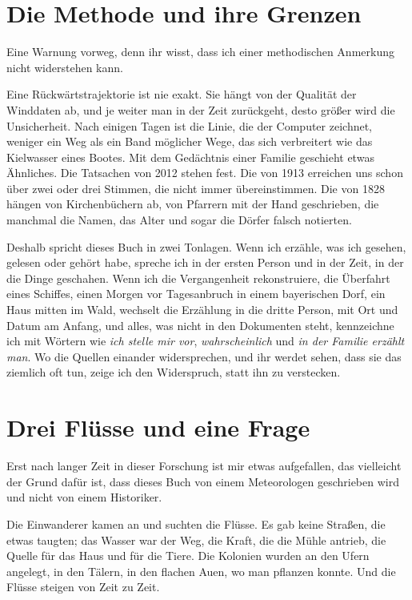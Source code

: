 \documentclass[
  ngerman,
  11pt,
  openany]{book}
\begin{document}
\section{Die Methode und ihre
Grenzen}\label{die-methode-und-ihre-grenzen}

Eine Warnung vorweg, denn ihr wisst, dass ich einer methodischen
Anmerkung nicht widerstehen kann.

Eine Rückwärtstrajektorie ist nie exakt. Sie hängt von der Qualität der
Winddaten ab, und je weiter man in der Zeit zurückgeht, desto größer
wird die Unsicherheit. Nach einigen Tagen ist die Linie, die der
Computer zeichnet, weniger ein Weg als ein Band möglicher Wege, das sich
verbreitert wie das Kielwasser eines Bootes. Mit dem Gedächtnis einer
Familie geschieht etwas Ähnliches. Die Tatsachen von 2012 stehen fest.
Die von 1913 erreichen uns schon über zwei oder drei Stimmen, die nicht
immer übereinstimmen. Die von 1828 hängen von Kirchenbüchern ab, von
Pfarrern mit der Hand geschrieben, die manchmal die Namen, das Alter und
sogar die Dörfer falsch notierten.

Deshalb spricht dieses Buch in zwei Tonlagen. Wenn ich erzähle, was ich
gesehen, gelesen oder gehört habe, spreche ich in der ersten Person und
in der Zeit, in der die Dinge geschahen. Wenn ich die Vergangenheit
rekonstruiere, die Überfahrt eines Schiffes, einen Morgen vor
Tagesanbruch in einem bayerischen Dorf, ein Haus mitten im Wald,
wechselt die Erzählung in die dritte Person, mit Ort und Datum am
Anfang, und alles, was nicht in den Dokumenten steht, kennzeichne ich
mit Wörtern wie \emph{ich stelle mir vor}, \emph{wahrscheinlich} und
\emph{in der Familie erzählt man}. Wo die Quellen einander
widersprechen, und ihr werdet sehen, dass sie das ziemlich oft tun,
zeige ich den Widerspruch, statt ihn zu verstecken.

\section{Drei Flüsse und eine
Frage}\label{drei-fluxfcsse-und-eine-frage}

Erst nach langer Zeit in dieser Forschung ist mir etwas aufgefallen, das
vielleicht der Grund dafür ist, dass dieses Buch von einem Meteorologen
geschrieben wird und nicht von einem Historiker.

Die Einwanderer kamen an und suchten die Flüsse. Es gab keine Straßen,
die etwas taugten; das Wasser war der Weg, die Kraft, die die Mühle
antrieb, die Quelle für das Haus und für die Tiere. Die Kolonien wurden
an den Ufern angelegt, in den Tälern, in den flachen Auen, wo man
pflanzen konnte. Und die Flüsse steigen von Zeit zu Zeit.
\end{document}
